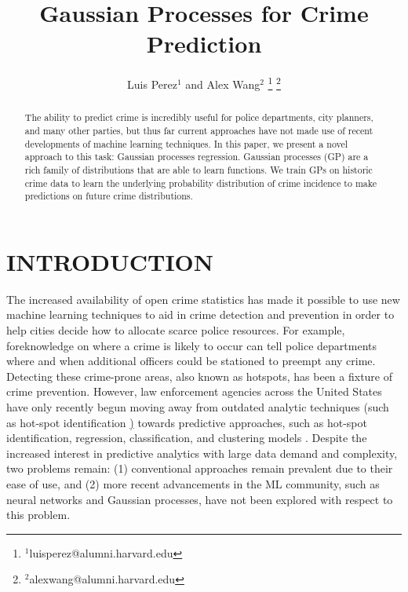 \documentclass[letterpaper, 11 pt, conference]{ieeeconf}  %
\title{\LARGE \bf
Gaussian Processes for Crime Prediction
}
\author{Luis Perez$^{1}$ and Alex Wang$^{2}$%
\thanks{$^{1}$luisperez@alumni.harvard.edu}%
\thanks{$^{2}$alexwang@alumni.harvard.edu}%
}
\begin{document}
\maketitle
\thispagestyle{empty}
\pagestyle{empty}


\begin{abstract}


The ability to predict crime is incredibly useful for police departments, city planners, and many other parties, but thus far current approaches have not made use of recent developments of machine learning techniques. In this paper, we present a novel approach to this task: Gaussian processes regression. Gaussian processes (GP) are a rich family of distributions that are able to learn functions. We train GPs on historic crime data to learn the underlying probability distribution of crime incidence to make predictions on future crime distributions.
\end{abstract}


\section{INTRODUCTION}
The increased availability of open crime statistics has made it possible to use new machine learning techniques to aid in crime detection and prevention in order to help cities decide how to allocate scarce police resources. For example, foreknowledge on where a crime is likely to occur can tell police departments where and when additional officers could be stationed to preempt any crime. Detecting these crime-prone areas, also known as hotspots, has been a fixture of crime prevention. However, law enforcement agencies across the United States have only recently begun moving away from outdated analytic techniques (such as hot-spot identification \href{hotspot_mapping}) towards predictive approaches, such as hot-spot identification, regression, classification, and clustering models \cite{predictive_policing} \cite{hotspot_matrix}. Despite the increased interest in predictive analytics with large data demand and complexity, two problems remain: (1) conventional approaches remain prevalent due to their ease of use, and (2) more recent advancements in the ML community, such as neural networks and Gaussian processes, have not been explored with respect to this problem.
\end{document}
